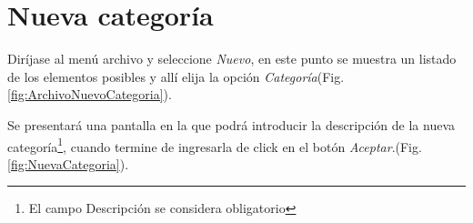 \section{Nueva categor\'ia}
\label{sec:nuevaCategoria}
Dir\'ijase al men\'u archivo y seleccione \emph{Nuevo}, en este punto se muestra un listado de los elementos posibles y
all\'i elija la opci\'on \emph{Categor\'ia}(Fig.\ref{fig:ArchivoNuevoCategoria}). 
  

Se presentar\'a una pantalla en la que podr\'a introducir la descripci\'on de la
nueva categor\'ia\footnote{El campo Descripci\'on se considera obligatorio}, cuando termine de ingresarla de click en el bot\'on \emph{Aceptar}.(Fig.\ref{fig:NuevaCategoria}).
  
